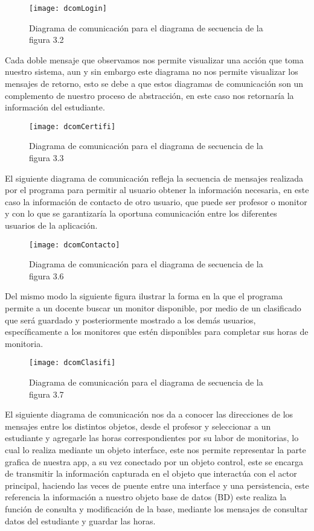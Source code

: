 \begin{figure}[H]
	\centering
	\texttt{[image: dcomLogin]}
    \centering
    \caption{Diagrama de comunicación para el diagrama de secuencia de la figura 3.2}
	\label{fig:dcomLogin}
\end{figure}
\clearpage
Cada doble mensaje que observamos nos permite visualizar una acción que toma nuestro sistema, aun y sin embargo este diagrama no nos permite visualizar los mensajes de retorno, esto se debe a que estos diagramas de comunicación son un complemento de nuestro proceso de abstracción, en este caso nos retornaría la información del estudiante. 
\begin{figure}[H]
	\centering
	\texttt{[image: dcomCertifi]}
    \centering
    \caption{Diagrama de comunicación para el diagrama de secuencia de la figura 3.3}
	\label{fig:dcomCertifi}
\end{figure}
\clearpage
El siguiente diagrama de comunicación refleja la secuencia de mensajes realizada por el programa para permitir al usuario obtener la información necesaria, en este caso la información de contacto de otro usuario, que puede ser profesor o monitor y con lo que se garantizaría la oportuna comunicación entre los diferentes usuarios de la aplicación. 
\begin{figure}[H]
	\centering
	\texttt{[image: dcomContacto]}
    \centering
    \caption{Diagrama de comunicación para el diagrama de secuencia de la figura 3.6}
	\label{fig:dcomContacto}
\end{figure}
\clearpage
Del mismo modo la siguiente figura ilustrar la forma en la que el programa permite a un docente buscar un monitor disponible, por medio de un clasificado que será guardado y posteriormente mostrado a los demás usuarios, específicamente a los monitores que estén disponibles para completar sus horas de monitoria.
\begin{figure}[H]
	\centering
	\texttt{[image: dcomClasifi]}
    \centering
    \caption{Diagrama de comunicación para el diagrama de secuencia de la figura 3.7}
	\label{fig:dcomClasifi}
\end{figure}
\clearpage
El siguiente diagrama de comunicación nos da a conocer las direcciones de los mensajes entre los distintos objetos, desde el profesor y seleccionar a un estudiante y agregarle las horas correspondientes por su labor de monitorias, lo cual lo realiza mediante un objeto interface, este nos permite representar la parte grafica de nuestra app, a su vez conectado por un objeto control, este se encarga de transmitir la información capturada en el objeto que interactúa con el actor principal, haciendo las veces de puente entre una interface y una persistencia, este referencia la información a nuestro objeto base de datos (BD) este realiza la función de consulta y modificación de la base, mediante los mensajes de consultar datos del estudiante y guardar las horas.
